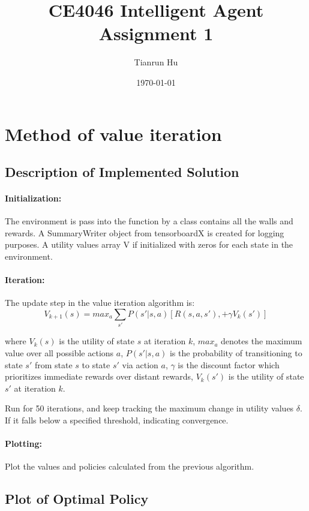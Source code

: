 \documentclass{article}
\title{CE4046 Intelligent Agent Assignment 1}
\author{Tianrun Hu}
\date{\today}
\begin{document}
\maketitle

\section{Method of value iteration}

\subsection{Description of Implemented Solution}

\paragraph{Initialization:} The environment is pass into the function by a class contains all the walls and rewards. A SummaryWriter object from tensorboardX is created for logging purposes. A utility values array V if initialized with zeros for each state in the environment.

\paragraph{Iteration:} The update step in the value iteration algorithm is:
\[V_{k+1}(s) = max_a \sum_{s'}P(s'|s, a) [R(s, a, s'), + \gamma V_k(s')] \]

where $V_k(s)$ is the utility of state $s$ at iteration $k$, $max_a$ denotes the maximum value over all possible actions $a$, $P(s' | s, a) $ is the probability of transitioning to state $s'$ from state $s$ to state $s'$ via action $a$, $\gamma$ is the discount factor which prioritizes immediate rewards over distant rewards, $V_k(s')$ is the utility of state $s'$ at iteration $k$.

Run for 50 iterations, and keep tracking the maximum change in utility values $\delta$. If it falls below a specified threshold, indicating convergence.

\paragraph{Plotting:} Plot the values and policies calculated from the previous algorithm.

\subsection{Plot of Optimal Policy}
\end{document}
